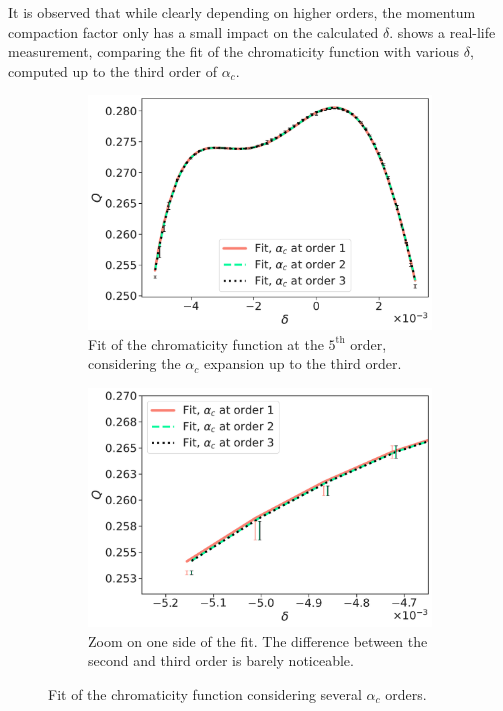 It is observed that while clearly depending on higher orders, the momentum compaction factor only
has a small impact on the calculated $\delta$.
 shows a real-life 
measurement, comparing the fit of the chromaticity function with various $\delta$, computed up to
the third order of $\alpha_c$.

\begin{figure}[tbh]
    \centering
    \begin{subfigure}[t]{0.48\textwidth}
        \centering
        \includegraphics[width=\textwidth]{images/chroma_function_alpha_c.pdf}
        \caption{Fit of the chromaticity function at the $5^{\text{th}}$ order, considering the
        $\alpha_c$ expansion up to the third order.}
    \end{subfigure}
    \hfill
    \begin{subfigure}[t]{0.48\textwidth}
        \centering
        \includegraphics[width=\textwidth]{images/chroma_function_alpha_c_zoom.pdf}
        \caption{Zoom on one side of the fit. The difference between the second and third order
        is barely noticeable.}
    \end{subfigure}
    \caption{Fit of the chromaticity function considering several $\alpha_c$ orders.}
    \label{fig:decapoles:chromaticity:momentum_compaction_factor_chroma_meas}
\end{figure}


